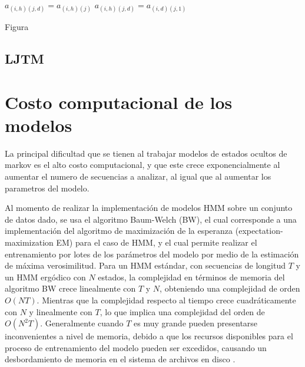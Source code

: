 $a_{(i,h)(j,d)} = a_{(i,h)(j)}$
$a_{(i,h)(j,d)} = a_{(i,d)(j,1)}$

Figura




\subsection{LJTM}



\section{Costo computacional de los modelos} %
\label{section3.2}


La principal dificultad que se tienen al trabajar modelos de estados ocultos de markov es el alto costo computacional, y que este crece exponencialmente al aumentar el numero de secuencias a analizar, al igual que al aumentar los parametros del modelo. 

Al momento de realizar la implementación de modelos HMM sobre un conjunto de datos dado, se usa el algoritmo Baum-Welch (BW), el cual corresponde a una implementación del algoritmo de maximización de la esperanza (expectation-maximization EM) para el caso de HMM, y el cual permite realizar el entrenamiento por lotes de los parámetros del modelo por medio de la estimación de máxima verosimilitud. Para un HMM estándar, con secuencias de longitud $T$ y un HMM ergódico con $N$ estados, la complejidad en términos de memoria del algoritmo BW crece linealmente con $T$ y $N$, obteniendo una complejidad de orden $O(NT)$. Mientras que la complejidad respecto al tiempo crece cuadráticamente con $N$ y linealmente con $T$, lo que implica una complejidad del orden de $O(N^2T)$. Generalmente cuando $T$ es muy grande pueden presentarse inconvenientes a nivel de memoria, debido a que los recursos disponibles para el proceso de entrenamiento del modelo pueden ser excedidos, causando un desbordamiento de memoria en el sistema de archivos en disco \cite{Khreich2010,Yu2010}.

